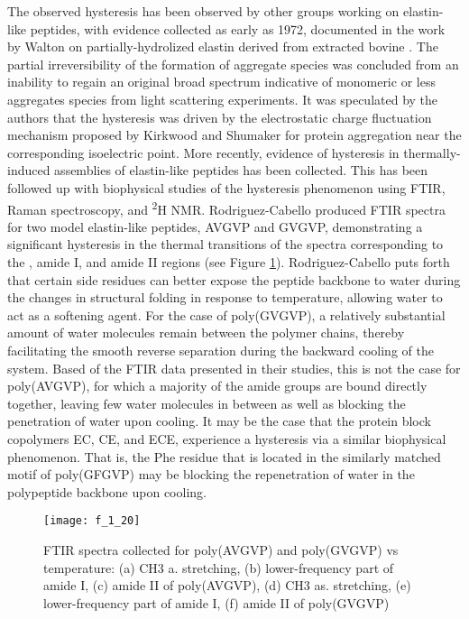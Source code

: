\begin{refsection}
The observed hysteresis has been observed by other groups working on
elastin-like peptides, with evidence collected as early as 1972, documented in
the work by Walton on partially-hydrolized elastin derived from extracted bovine
.\cite{Jamieson1972a} The partial irreversibility of
the formation of aggregate species was concluded from an inability to regain an
original broad spectrum indicative of monomeric or less aggregates species from
light scattering experiments. It was speculated by the authors that the
hysteresis was driven by the electrostatic charge fluctuation mechanism proposed
by Kirkwood and Shumaker\cite{Kirkwood1952} for protein aggregation near the
corresponding isoelectric point. More recently, evidence of hysteresis in
thermally-induced assemblies of elastin-like peptides has been
collected.\cite{Osborne2008,Herrero-Vanrell2005} This has been followed up with
biophysical studies of the hysteresis phenomenon using FTIR, Raman spectroscopy,
and \textsuperscript{2}H NMR.\cite{Schmidt2005,Ma2012b} Rodriguez-Cabello
produced FTIR spectra for two model elastin-like peptides, AVGVP and GVGVP,
demonstrating a significant hysteresis in the thermal transitions of the spectra
corresponding to the , amide I, and amide II regions (see Figure
\ref{fig:lcst_cabello}).  Rodriguez-Cabello puts forth that certain side residues
can better expose the peptide backbone to water during the changes in structural
folding in response to temperature, allowing water to act as a softening agent.
For the case of poly(GVGVP), a relatively substantial amount of water molecules
remain between the polymer chains, thereby facilitating the smooth reverse
separation during the backward cooling of the system. Based of the FTIR data
presented in their studies, this is not the case for poly(AVGVP), for which a
majority of the amide groups are bound directly together, leaving few water
molecules in between as well as blocking the penetration of water upon cooling.
It may be the case that the protein block copolymers EC, CE, and ECE, experience
a hysteresis via a similar biophysical phenomenon. That is, the Phe residue that
is located in the similarly matched motif of poly(GFGVP) may be blocking the
repenetration of water in the polypeptide backbone upon cooling. 

\begin{figure}[h!] \centering \texttt{[image: f\_1\_20]}
    \caption[FTIR spectra collected for poly(AVGVP) and poly(GVGVP) vs
        temperature: (a) CH3 a. stretching, (b) lower-frequency part of amide I,
        (c) amide II of poly(AVGVP), (d) CH3 as. stretching, (e) lower-frequency
        part of amide I, (f) amide II of poly(GVGVP)]{FTIR spectra collected for
            poly(AVGVP) and poly(GVGVP) vs temperature: (a) CH3 a. stretching,
            (b) lower-frequency part of amide I, (c) amide II of poly(AVGVP),
            (d) CH3 as. stretching, (e) lower-frequency part of amide I, (f)
            amide II of poly(GVGVP)\cite{Schmidt2005}}\label{fig:lcst_cabello}
        \end{figure}



\end{refsection}
